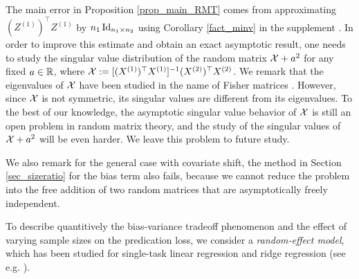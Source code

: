 \begin{remark}
The main error in Proposition \ref{prop_main_RMT} comes from approximating $(Z^{(1)})^\top Z^{(1)}$ by $n_1\id_{n_1\times n_2}$ using Corollary \ref{fact_minv} in the supplement \cite{MTL_suppl}. In order to improve this estimate and obtain an exact asymptotic result, one needs to study the singular value distribution of the  random matrix $\cal X + a^2$ for any fixed $a\in \R$, where $\cal X:=[(X^{(1)})^{\top}X^{(1)}]^{-1}(X^{(2)})^{\top}X^{(2)}$. We remark that the eigenvalues of $\cal X$ have been studied in the name of Fisher matrices \cite{Fmatrix}. However, since $\cal X$ is not symmetric, its singular values are different from its eigenvalues. To the best of our knowledge, the asymptotic singular value behavior of $\cal X$ is still an open problem in random matrix theory, and the study of the singular values of $\cal X + a^2$ will be even harder. We leave this problem to future study.

We also remark for the general case with covariate shift, the method in Section \ref{sec_sizeratio} for the bias term also fails, because we cannot reduce the problem into the free addition of two random matrices that are asymptotically freely independent.
\end{remark}









To describe quantitively the bias-variance tradeoff phenomenon and the effect of varying sample sizes on the predication loss, we consider a \emph{random-effect model}, which has been studied for  single-task linear regression and ridge regression (see e.g. \cite{dobriban2020wonder,dobriban2018high}).




